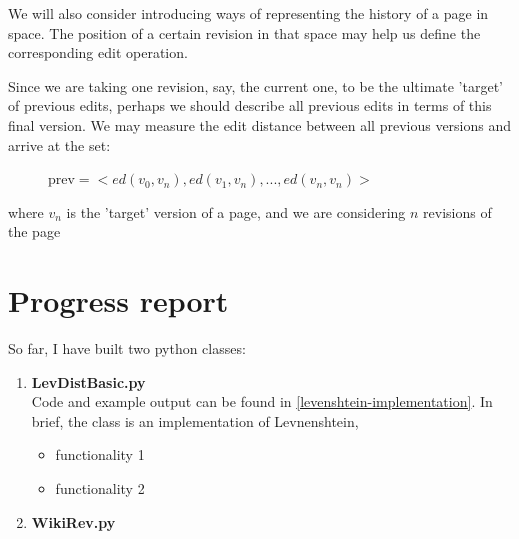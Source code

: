 \documentclass[a4paper,11pt,twoside,notitlepage]{article}
\begin{document}
        

        

        We will also consider introducing ways of representing the
        history of a page in space. The position of a certain revision
        in that space may help us define the corresponding edit operation.

        Since we are taking one revision, say, the current one, to be
        the ultimate 'target' of previous edits, perhaps we should
        describe all previous edits in terms of this final version. We
        may measure the edit distance between all previous versions
        and arrive at the set:
        
        \begin{figure}[h!]
          \centering
          $\text{prev} = <ed(v_0,v_n),ed(v_1,v_n),...,ed(v_n,v_n)>$  
        \end{figure}
        
        where $v_n$ is the 'target' version of a page, and we are
        considering $n$ revisions of the page

        

        \section{Progress report}
        So far, I have built two python classes:
        \begin{enumerate}
          \item \textbf{LevDistBasic.py}\\
            Code and example output can be found in
            \cref{levenshtein-implementation}. In brief, the class is
            an implementation of Levnenshtein, 
 
            \begin{itemize}
              \item functionality 1
              \item functionality 2
            \end{itemize}
          \item \textbf{WikiRev.py}
        \end{enumerate}
\end{document}
